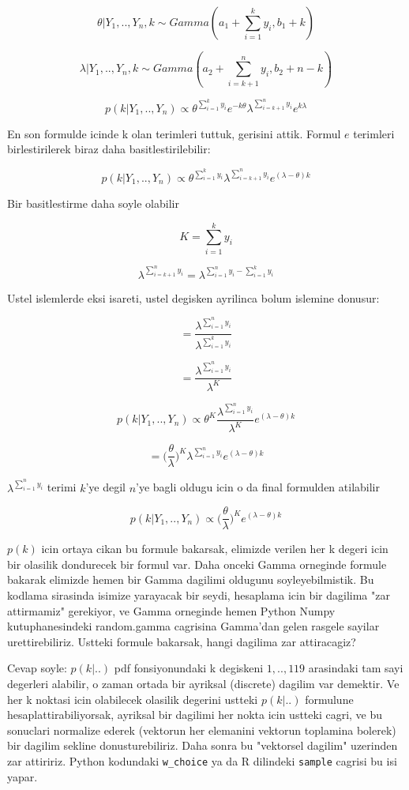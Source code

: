 \documentclass[12pt,fleqn]{article}\usepackage{../common}
\begin{document}
$$ \theta | Y_1,..,Y_n,k \sim Gamma(a_1 + \sum_{i=1}^{k} y_i, b_1+k) $$

$$ \lambda | Y_1,..,Y_n,k \sim Gamma(a_2 + \sum_{i=k+1}^{n} y_i, b_2+n-k) $$

$$ 
p(k | Y_1,..,Y_n) \propto \theta^{\sum_{i=1}^{k} y_i}e^{-k\theta} 
\lambda^{\sum_{i=k+1}^n y_i}e^{k\lambda} 
 $$

En son formulde icinde k olan terimleri tuttuk, gerisini attik. Formul $e$
terimleri birlestirilerek biraz daha basitlestirilebilir:

$$ p(k | Y_1,..,Y_n) \propto
\theta^{\sum_{i=1}^{k} y_i} \lambda^{\sum_{i=k+1}^n y_i}e^{(\lambda-\theta)k} 
 $$

Bir basitlestirme daha soyle olabilir

$$ K = \sum_{i=1}^{k} y_i  $$

$$ \lambda^{\sum_{i=k+1}^n y_i} = \lambda^{\sum_{i=1}^n y_i - \sum_{i=1}^k y_i} $$

Ustel islemlerde eksi isareti, ustel degisken ayrilinca bolum islemine donusur:

$$ = \frac{\lambda^{\sum_{i=1}^n y_i}}{\lambda ^{\sum_{i=1}^k y_i}} $$

$$ = \frac{\lambda^{\sum_{i=1}^n y_i}}{\lambda ^{K}} $$

$$ p(k | Y_1,..,Y_n) \propto 
\theta^{K} \frac{\lambda^{\sum_{i=1}^n y_i}}{\lambda ^{K}} e^{(\lambda-\theta)k} 
 $$

$$ = \bigg(\frac{\theta}{\lambda}\bigg)^{K} \lambda^{\sum_{i=1}^n  y_i} e^{(\lambda-\theta)k} $$

$\lambda^{\sum_{i=1}^n y_i}$ terimi $k$'ye degil $n$'ye bagli oldugu
icin o da final formulden atilabilir

$$  
p(k | Y_1,..,Y_n) \propto \bigg(\frac{\theta}{\lambda}\bigg)^{K} 
e^{(\lambda-\theta)k}  
$$  

$p(k)$ icin ortaya cikan bu formule bakarsak, elimizde verilen her k
degeri icin bir olasilik dondurecek bir formul var. Daha onceki Gamma
orneginde formule bakarak elimizde hemen bir Gamma dagilimi oldugunu
soyleyebilmistik. Bu kodlama sirasinda isimize yarayacak bir seydi,
hesaplama icin bir dagilima "zar attirmamiz" gerekiyor, ve Gamma
orneginde hemen Python Numpy kutuphanesindeki random.gamma cagrisina
Gamma'dan gelen rasgele sayilar urettirebiliriz. Ustteki formule
bakarsak, hangi dagilima zar attiracagiz?

Cevap soyle: $p(k|..)$ pdf fonsiyonundaki k degiskeni $1,..,119$ arasindaki
tam sayi degerleri alabilir, o zaman ortada bir ayriksal (discrete) dagilim
var demektir. Ve her k noktasi icin olabilecek olasilik degerini ustteki
$p(k|..)$ formulune hesaplattirabiliyorsak, ayriksal bir dagilimi her nokta
icin ustteki cagri, ve bu sonuclari normalize ederek (vektorun her
elemanini vektorun toplamina bolerek) bir dagilim sekline
donusturebiliriz. Daha sonra bu "vektorsel dagilim" uzerinden zar
attiririz. Python kodundaki \verb!w_choice! ya da R dilindeki \verb!sample!
cagrisi bu isi yapar.
\end{document}
